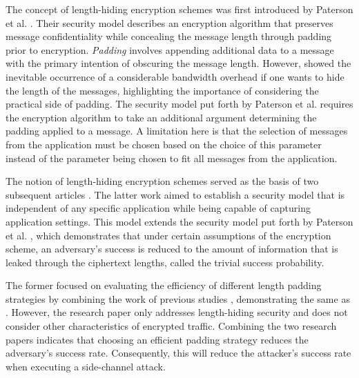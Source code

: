 The concept of length-hiding encryption schemes was first introduced by Paterson et al. \cite{DBLP:conf/asiacrypt/PatersonRS11}. Their security model describes an encryption algorithm that preserves message confidentiality while concealing the message length through padding prior to encryption. \textit{Padding} involves appending additional data to a message with the primary intention of obscuring the message length. However, \cite{DBLP:conf/acns/TezcanV11} showed the inevitable occurrence of a considerable bandwidth overhead if one wants to hide the length of the messages, highlighting the importance of considering the practical side of padding. The security model put forth by Paterson et al. \cite{DBLP:conf/asiacrypt/PatersonRS11} requires the encryption algorithm to take an additional argument determining the padding applied to a message. A limitation here is that the selection of messages from the application must be chosen based on the choice of this parameter instead of the parameter being chosen to fit all messages from the application.

The notion of length-hiding encryption schemes served as the basis of two subsequent articles \cite{DBLP:conf/ccs/Degabriele21, DBLP:conf/ctrsa/GellertJLN22}. The latter work \cite{DBLP:conf/ctrsa/GellertJLN22} aimed to establish a security model that is independent of any specific application while being capable of capturing application settings. This model extends the security model put forth by Paterson et al. \cite{DBLP:conf/asiacrypt/PatersonRS11}, which demonstrates that under certain assumptions of the encryption scheme, an adversary's success is reduced to the amount of information that is leaked through the ciphertext lengths, called the trivial success probability.

The former \cite{DBLP:conf/ccs/Degabriele21} focused on evaluating the efficiency of different length padding strategies by combining the work of previous studies \cite{DBLP:conf/asiacrypt/PatersonRS11, DBLP:conf/acns/TezcanV11}, demonstrating the same as \cite{DBLP:conf/ctrsa/GellertJLN22}. However, the research paper only addresses length-hiding security and does not consider other characteristics of encrypted traffic. Combining the two research papers \cite{DBLP:conf/ccs/Degabriele21, DBLP:conf/ctrsa/GellertJLN22} indicates that choosing an efficient padding strategy reduces the adversary's success rate. Consequently, this will reduce the attacker's success rate when executing a side-channel attack.


